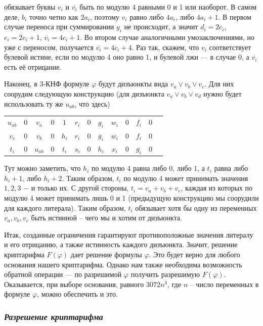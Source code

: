 \documentclass{article}
\begin{document}
\noindent обязывает буквы $v_i$ и $\overline{v_i}$ быть по модулю 4 равными 0 и 1 или наоборот. В самом деле, $b_i$ точно четно как $2a_i$, поэтому $v_i$ равно либо $4a_i$, либо $4a_i+1$. В первом случае переноса при суммировании $y_i$ не происходит, а значит $d_i = 2c_i$, $e_i = 2c_i + 1$, $\overline{v_i} = 4c_i + 1$. Во втором случае аналогичными умозаключениями, но уже с переносом, получается  $\overline{v_i} = 4c_i + 4$.
Раз так, скажем, что $v_i$ соответствует булевой истине, если по модулю 4 оно равно 1, и булевой лжи --- в случае 0, а  $\overline{v_i}$ есть её отрицание.

Наконец, в 3-КНФ формуле $\varphi$ будут дизъюнкты вида $v_a \vee v_b \vee v_c$. Для них соорудим следующую конструкцию (для дизъюнкта $v_a \vee v_b \vee v_d$ нужно будет использовать ту же $u_{ab}$, что здесь)

\begin{center}
\begin{tabular}{c*{12}{@{\ }c}}
 $u_{ab}$ & 0 & $v_a$ & 0 & $1$ & $r_i$ & 0 & $g_i$ & $w_i$ & 0 & $f_i$ & 0 \\ 
$v_c$ & 0 & $v_b$ & 0 & $h_i$ & $r_i$ & 0 & $g_i$ & $w_i$ & 0 & $f_i$ & 0 \\
 \hline
 $t_i$ & 0 & $u_{ab}$ & 0 & $t_i$ & $s_i$ & 0 & $h_i$ & $x_i$ & 0 & $g_i$ & 0    
\end{tabular}
\end{center}

\noindent Тут можно заметить, что $h_i$ по модулю 4 равна либо 0, либо 1, а $t_i$ равна либо $h_i + 1$, либо $h_i + 2$. Таким образом, $t_i$ по модулю 4 может принимать значения $1, 2, 3$ $-$ и только их.
С другой стороны, $t_i = v_a + v_b + v_c$, каждая из которых по модулю 4 может принимать лишь 0 и 1 (предыдущую конструкцию мы соорудили для каждого литерала). Таким образом, $t_i$ обязывает хотя бы одну из переменных $v_a, v_b, v_c$ быть истинной -- чего мы и хотим от дизъюнкта.

Итак, созданные ограничения гарантируют противоположные значения литералу и его отрицанию, а также истинность каждого дизъюнкта. Значит, решение криптарифма $F(\varphi)$  дает решение формулы $\varphi$. Это будет верно для любого основания нашего криптарифма. Однако нам также необходима возможность обратной операции --- по разрешимой $\varphi$ получить разрешимую $F(\varphi)$.
Оказывается, при выборе основания, равного $3072n^3$, где $n$ -- число переменных в формуле $\varphi$, можно обеспечить и это.

\subsubsection*{\textit{Разрешение криптарифма}}
\end{document}

